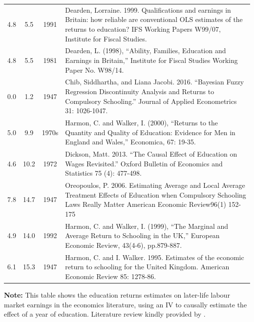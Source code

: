 \begin{table}[!htbp]
{\begin{tabular}{c c c p{12.75cm}}
        4.8 & 5.5 &   1991 & Dearden, Lorraine. 1999. Qualifications and earnings in Britain: how reliable are conventional OLS estimates of the returns to education? IFS Working Papers W99/07, Institute for Fiscal Studies. \\
        4.8 & 5.5 &   1981 & Dearden, L. (1998), ``Ability, Families, Education and Earnings in Britain,'' Institute for Fiscal Studies Working Paper No. W98/14. \\
        0.0 & 1.2 &   1947 & Chib, Siddhartha, and Liana Jacobi. 2016. “Bayesian Fuzzy Regression Discontinuity Analysis and Returns to Compulsory Schooling.” Journal of Applied Econometrics 31: 1026-1047. \\
        5.0 & 9.9 &   1970s & Harmon, C. and Walker, I. (2000), ``Returns to the Quantity and Quality of Education: Evidence for Men in England and Wales,'' Economica, 67: 19-35. \\
        4.6 & 10.2 &  1972 & Dickson, Matt. 2013. “The Causal Effect of Education on Wages Revisited.” Oxford Bulletin of Economics and Statistics 75 (4): 477-498. \\
        7.8 & 14.7 &  1947 & Oreopoulos, P. 2006. Estimating Average and Local Average Treatment Effects of Education when Compulsory Schooling Laws Really Matter American Economic Review96(1) 152-175 \\
        4.9 & 14.0 &  1992 & Harmon, C. and Walker, I. (1999), ``The Marginal and Average Return to Schooling in the UK,'' European Economic Review, 43(4-6), pp.879-887. \\
        6.1 & 15.3 &  1947 & Harmon, C. and I. Walker. 1995. Estimates of the economic return to schooling for the United Kingdom. American Economic Review 85: 1278-86. \\
        \bottomrule
    \end{tabular}}
    \label{tab:uk-meta}
    \justify
    \footnotesize
    \textbf{Note:}
    This table shows the education returns estimates on later-life labour market earnings in the economics literature, using an IV to causally estimate the effect of a year of education.
    Literature review kindly provided by \cite{patrinos2025causal}.
\end{table}
